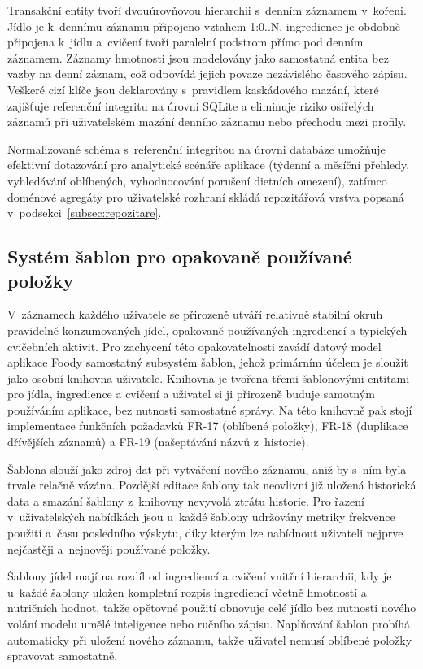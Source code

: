 Transakční entity tvoří dvouúrovňovou hierarchii s~denním záznamem v~kořeni.
Jídlo je k~dennímu záznamu připojeno vztahem 1:0..N, ingredience je obdobně připojena k~jídlu a~cvičení tvoří paralelní podstrom přímo pod denním záznamem.
Záznamy hmotnosti jsou modelovány jako samostatná entita bez vazby na denní záznam, což odpovídá jejich povaze nezávislého časového zápisu.
Veškeré cizí klíče jsou deklarovány s~pravidlem kaskádového mazání, které zajišťuje referenční integritu na úrovni SQLite a eliminuje riziko osiřelých záznamů při uživatelském mazání denního záznamu nebo přechodu mezi profily.

Normalizované schéma s~referenční integritou na úrovni databáze umožňuje efektivní dotazování pro analytické scénáře aplikace (týdenní a měsíční přehledy, vyhledávání oblíbených, vyhodnocování porušení dietních omezení), zatímco doménové agregáty pro uživatelské rozhraní skládá repozitářová vrstva popsaná v~podsekci~\ref{subsec:repozitare}.

\subsection{Systém šablon pro opakovaně používané položky}
\label{subsec:sablony}

V~záznamech každého uživatele se přirozeně utváří relativně stabilní okruh pravidelně konzumovaných jídel, opakovaně používaných ingrediencí a typických cvičebních aktivit.
Pro zachycení této opakovatelnosti zavádí datový model aplikace Foody samostatný subsystém šablon, jehož primárním účelem je sloužit jako osobní knihovna uživatele.
Knihovna je tvořena třemi šablonovými entitami pro jídla, ingredience a cvičení a uživatel si ji přirozeně buduje samotným používáním aplikace, bez nutnosti samostatné správy.
Na této knihovně pak stojí implementace funkčních požadavků FR-17 (oblíbené položky), FR-18 (duplikace dřívějších záznamů) a FR-19 (našeptávání názvů z~historie).

Šablona slouží jako zdroj dat při vytváření nového záznamu, aniž by s~ním byla trvale relačně vázána.
Pozdější editace šablony tak neovlivní již uložená historická data a smazání šablony z~knihovny nevyvolá ztrátu historie.
Pro řazení v~uživatelských nabídkách jsou u~každé šablony udržovány metriky frekvence použití a~času posledního výskytu, díky kterým lze nabídnout uživateli nejprve nejčastěji a~nejnověji používané položky.

Šablony jídel mají na rozdíl od ingrediencí a cvičení vnitřní hierarchii, kdy je u~každé šablony uložen kompletní rozpis ingrediencí včetně hmotností a nutričních hodnot, takže opětovné použití obnovuje celé jídlo bez nutnosti nového volání modelu umělé inteligence nebo ručního zápisu.
Naplňování šablon probíhá automaticky při uložení nového záznamu, takže uživatel nemusí oblíbené položky spravovat samostatně.

